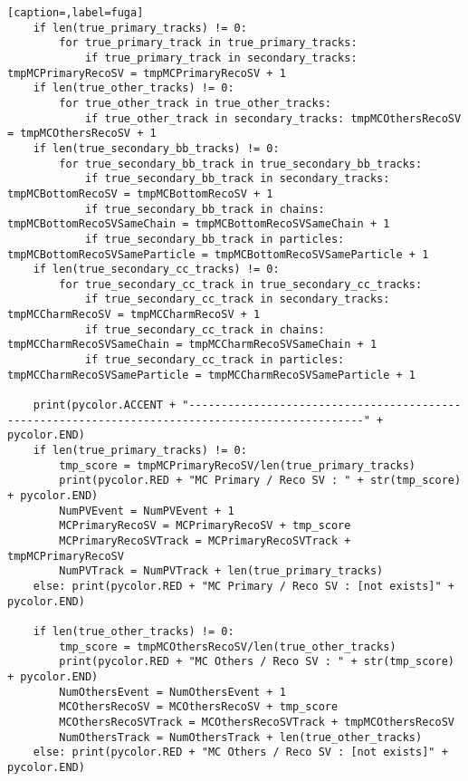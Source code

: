 \begin{lstlisting}[caption=,label=fuga]
    if len(true_primary_tracks) != 0:
        for true_primary_track in true_primary_tracks:
            if true_primary_track in secondary_tracks: tmpMCPrimaryRecoSV = tmpMCPrimaryRecoSV + 1
    if len(true_other_tracks) != 0:
        for true_other_track in true_other_tracks:
            if true_other_track in secondary_tracks: tmpMCOthersRecoSV = tmpMCOthersRecoSV + 1
    if len(true_secondary_bb_tracks) != 0:
        for true_secondary_bb_track in true_secondary_bb_tracks:
            if true_secondary_bb_track in secondary_tracks: tmpMCBottomRecoSV = tmpMCBottomRecoSV + 1
            if true_secondary_bb_track in chains: tmpMCBottomRecoSVSameChain = tmpMCBottomRecoSVSameChain + 1
            if true_secondary_bb_track in particles: tmpMCBottomRecoSVSameParticle = tmpMCBottomRecoSVSameParticle + 1
    if len(true_secondary_cc_tracks) != 0:
        for true_secondary_cc_track in true_secondary_cc_tracks:
            if true_secondary_cc_track in secondary_tracks: tmpMCCharmRecoSV = tmpMCCharmRecoSV + 1
            if true_secondary_cc_track in chains: tmpMCCharmRecoSVSameChain = tmpMCCharmRecoSVSameChain + 1
            if true_secondary_cc_track in particles: tmpMCCharmRecoSVSameParticle = tmpMCCharmRecoSVSameParticle + 1

    print(pycolor.ACCENT + "-------------------------------------------------------------------------------------------------" + pycolor.END)
    if len(true_primary_tracks) != 0:
        tmp_score = tmpMCPrimaryRecoSV/len(true_primary_tracks)
        print(pycolor.RED + "MC Primary / Reco SV : " + str(tmp_score) + pycolor.END)
        NumPVEvent = NumPVEvent + 1
        MCPrimaryRecoSV = MCPrimaryRecoSV + tmp_score
        MCPrimaryRecoSVTrack = MCPrimaryRecoSVTrack + tmpMCPrimaryRecoSV
        NumPVTrack = NumPVTrack + len(true_primary_tracks)
    else: print(pycolor.RED + "MC Primary / Reco SV : [not exists]" + pycolor.END)

    if len(true_other_tracks) != 0:
        tmp_score = tmpMCOthersRecoSV/len(true_other_tracks)
        print(pycolor.RED + "MC Others / Reco SV : " + str(tmp_score) + pycolor.END)
        NumOthersEvent = NumOthersEvent + 1
        MCOthersRecoSV = MCOthersRecoSV + tmp_score
        MCOthersRecoSVTrack = MCOthersRecoSVTrack + tmpMCOthersRecoSV
        NumOthersTrack = NumOthersTrack + len(true_other_tracks)
    else: print(pycolor.RED + "MC Others / Reco SV : [not exists]" + pycolor.END)


\end{lstlisting}
